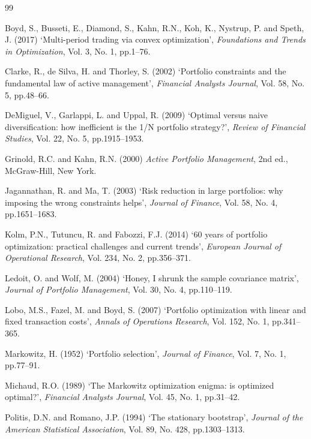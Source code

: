 \documentclass[11pt]{article}
\begin{document}
\FloatBarrier
\clearpage

\begin{thebibliography}{99}

Boyd, S., Busseti, E., Diamond, S., Kahn, R.N., Koh, K., Nystrup, P. and Speth, J. (2017)
`Multi-period trading via convex optimization', \emph{Foundations and Trends in Optimization}, Vol. 3, No. 1, pp.1--76.

Clarke, R., de Silva, H. and Thorley, S. (2002)
`Portfolio constraints and the fundamental law of active management', \emph{Financial Analysts Journal}, Vol. 58, No. 5, pp.48--66.

DeMiguel, V., Garlappi, L. and Uppal, R. (2009)
`Optimal versus naive diversification: how inefficient is the 1/N portfolio strategy?', \emph{Review of Financial Studies}, Vol. 22, No. 5, pp.1915--1953.

Grinold, R.C. and Kahn, R.N. (2000) \emph{Active Portfolio Management}, 2nd ed., McGraw-Hill, New York.

Jagannathan, R. and Ma, T. (2003)
`Risk reduction in large portfolios: why imposing the wrong constraints helps', \emph{Journal of Finance}, Vol. 58, No. 4, pp.1651--1683.

Kolm, P.N., Tutuncu, R. and Fabozzi, F.J. (2014)
`60 years of portfolio optimization: practical challenges and current trends', \emph{European Journal of Operational Research}, Vol. 234, No. 2, pp.356--371.

Ledoit, O. and Wolf, M. (2004)
`Honey, I shrunk the sample covariance matrix', \emph{Journal of Portfolio Management}, Vol. 30, No. 4, pp.110--119.

Lobo, M.S., Fazel, M. and Boyd, S. (2007)
`Portfolio optimization with linear and fixed transaction costs', \emph{Annals of Operations Research}, Vol. 152, No. 1, pp.341--365.

Markowitz, H. (1952)
`Portfolio selection', \emph{Journal of Finance}, Vol. 7, No. 1, pp.77--91.

Michaud, R.O. (1989)
`The Markowitz optimization enigma: is optimized optimal?', \emph{Financial Analysts Journal}, Vol. 45, No. 1, pp.31--42.

Politis, D.N. and Romano, J.P. (1994)
`The stationary bootstrap', \emph{Journal of the American Statistical Association}, Vol. 89, No. 428, pp.1303--1313.

\end{thebibliography}
\end{document}
